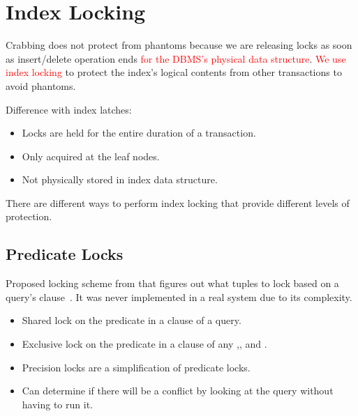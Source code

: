 \documentclass[11pt]{article}
\newcommand{\rr}[1]{\textcolor{red}{#1}}
\begin{document}
\section{Index Locking}
Crabbing does not protect from phantoms because we are releasing locks as soon as 
insert/delete operation ends \rr{for the DBMS's physical data structure}. 
\rr{We use index locking} to protect the index's logical contents from 
other transactions to avoid phantoms.

Difference with index latches:
\begin{itemize}
    \item
    Locks are held for the entire duration of a transaction.
    
    \item
    Only acquired at the leaf nodes.
    
    \item
    Not physically stored in index data structure.
\end{itemize}
There are different ways to perform index locking that provide different levels of protection.

\subsection*{Predicate Locks}
Proposed locking scheme from  that figures out what tuples to lock based on a query's  clause~\cite{p624-eswaran}. It was never implemented in a real system due to its complexity.

\begin{itemize}
    \item
    Shared lock on the predicate in a  clause of a  query.
    
    \item
    Exclusive lock on the predicate in a  clause of any ,, 
    and .
    
    \item
    Precision locks are a simplification of predicate locks.
    
    \item
    Can determine if there will be a conflict by looking at the query without having to run it.
\end{itemize}
\end{document}
